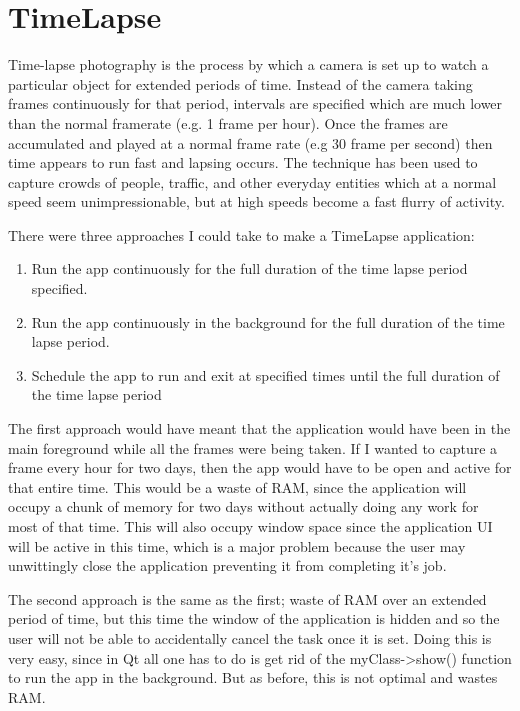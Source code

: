 \documentclass[11pt]{article} %
\begin{document}
\part{TimeLapse}
Time-lapse photography is the process by which a camera is set up to watch a particular object for extended periods of time. Instead of the camera taking frames continuously for that period, intervals are specified which are much lower than the normal framerate (e.g. 1 frame per hour). Once the frames are accumulated and played at a normal frame rate (e.g 30 frame per second) then time appears to run fast and lapsing occurs.
The technique has been used to capture crowds of people, traffic, and other everyday entities which at a normal speed seem unimpressionable, but at high speeds become a fast flurry of activity.

There were three approaches I could take to make a TimeLapse application:\\
\begin{enumerate}
\vspace{-20pt}
\item Run the app continuously for the full duration of the time lapse period specified.\\
\vspace{-20pt}
\item Run the app continuously in the background for the full duration of the time lapse period.\\
\vspace{-20pt}
\item Schedule the app to run and exit at specified times until the full duration of the time lapse period\\
\vspace{-10pt}
\end{enumerate}

The first approach would have meant that the application would have been in the main foreground while all the frames were being taken. If I wanted to capture a frame every hour for two days, then the app would have to be open and active for that entire time. This would be a waste of RAM, since the application will occupy a chunk of memory for two days without actually doing any work for most of that time. This will also occupy window space since the application UI will be active in this time, which is a major problem because the user may unwittingly close the application preventing it from completing it's job.

The second approach is the same as the first; waste of RAM over an extended period of time, but this time the window of the application is hidden and so the user will not be able to accidentally cancel the task once it is set. Doing this is very easy, since in Qt all one has to do is get rid of the myClass->show() function to run the app in the background. But as before, this is not optimal and wastes RAM.
\end{document}
